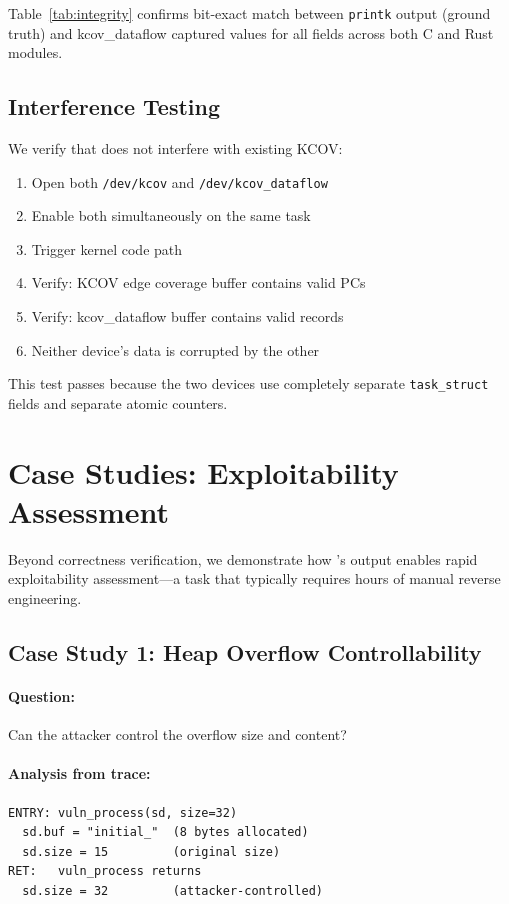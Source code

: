 \documentclass{ndss}
\begin{document}
Table~\ref{tab:integrity} confirms bit-exact match between \texttt{printk}
output (ground truth) and kcov\_dataflow captured values for all fields across
both C and Rust modules.

\subsection{Interference Testing}

We verify that \toolname{} does not interfere with existing KCOV:
\begin{enumerate}[nosep]
  \item Open both \texttt{/dev/kcov} and \texttt{/dev/kcov\_dataflow}
  \item Enable both simultaneously on the same task
  \item Trigger kernel code path
  \item Verify: KCOV edge coverage buffer contains valid PCs
  \item Verify: kcov\_dataflow buffer contains valid records
  \item Neither device's data is corrupted by the other
\end{enumerate}

This test passes because the two devices use completely separate
\texttt{task\_struct} fields and separate atomic counters.

\section{Case Studies: Exploitability Assessment}\label{sec:cases}

Beyond correctness verification, we demonstrate how \toolname{}'s output
enables rapid exploitability assessment---a task that typically requires hours
of manual reverse engineering.

\subsection{Case Study 1: Heap Overflow Controllability}

\paragraph{Question:} Can the attacker control the overflow size and content?

\paragraph{Analysis from \toolname{} trace:}
\begin{lstlisting}[numbers=none]
ENTRY: vuln_process(sd, size=32)
  sd.buf = "initial_"  (8 bytes allocated)
  sd.size = 15         (original size)
RET:   vuln_process returns
  sd.size = 32         (attacker-controlled)
\end{lstlisting}
\end{document}
